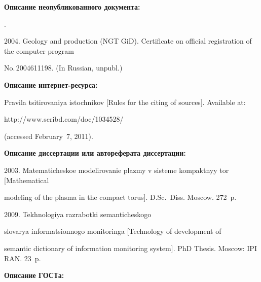 {{\begin{enumerate}[1.]
{%








\noindent


\textbf{Описание неопубликованного документа:}





.


2004. Geology and production (NGT GiD). Certificate on official registration of the computer program


No.\,2004611198. (In Russian, unpubl.)





\noindent


\textbf{Описание интернет-ресурса:}








Pravila tsitirovaniya istochnikov [Rules for the citing of sources]. Available at: {\sf


http://www.scribd.com/doc/1034528/} (accessed February~7, 2011).








\noindent


\textbf{Описание диссертации или автореферата диссертации:}







2003. Matematicheskoe modelirovanie plazmy v sisteme kompaktnyy tor [Mathematical


modeling of the plasma in the compact torus]. D.Sc.\ Diss. Moscow. 272~p.





 2009. Tekhnologiya razrabotki semanticheskogo


slovarya informatsionnogo monitoringa [Technology of development of


semantic dictionary of information monitoring system]. PhD Thesis. Moscow: IPI RAN. 23~p.








\noindent


\textbf{Описание ГОСТа:}





}
\end{enumerate}}}
